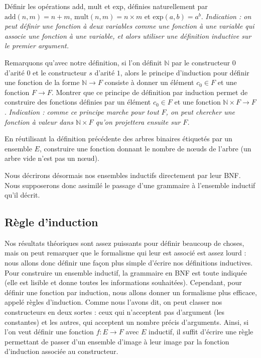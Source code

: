 \begin{exo}
    Définir les opérations add, mult et exp, définies naturellement par $\mathrm{add}(n,m) = n + m$, $\mathrm{mult}(n,m) = n \times m$ et $\mathrm{exp}(a,b) =  a^b$.\newline{}
    \textit{Indication : on peut définir une fonction à deux variables comme une fonction à une variable qui associe une fonction à une variable, et alors utiliser une définition inductive sur le premier argument.}
\end{exo}

\begin{exo}
    Remarquons qu'avec notre définition, si l'on définit $\mathbb N$ par le constructeur $0$ d'arité $0$ et le constructeur $s$ d'arité $1$, alors le principe d'induction pour définir une fonction de la forme $\mathbb N \to F$ consiste à donner un élément $c_0 \in F$ et une fonction $F\to F$. Montrer que ce principe de définition par induction permet de construire des fonctions définies par un élément $c_0\in F$ et une fonction $\mathbb N \times F \to F$. \textit{Indication : comme ce principe marche pour tout $F$, on peut chercher une fonction à valeur dans $\mathbb N \times F$ qu'on projettera ensuite sur $F$.}
\end{exo}

\begin{exo}\label{exo_arbre}
    En réutilisant la définition précédente des arbres binaires étiquetés par un ensemble $E$, construire une fonction donnant le nombre de n\oe uds de l'arbre (un arbre vide n'est pas un n\oe ud).
\end{exo}

Nous décrirons désormais nos ensembles inductifs directement par leur BNF. Nous supposerons donc assimilé le passage d'une grammaire à l'ensemble inductif qu'il décrit.

\subsection{Règle d'induction}

Nos résultats théoriques sont assez puissants pour définir beaucoup de choses, mais on peut remarquer que le formalisme qui leur est associé est assez lourd : nous allons donc définir une façon plus simple d'écrire nos définitions inductives. Pour construire un ensemble inductif, la grammaire en BNF est toute indiquée (elle est lisible et donne toutes les informations souhaitées). Cependant, pour définir une fonction par induction, nous allons donner un formalisme plus efficace, appelé règles d'induction. Comme nous l'avons dit, on peut classer nos constructeurs en deux sortes : ceux qui n'acceptent pas d'argument (les constantes) et les autres, qui acceptent un nombre précis d'arguments. Ainsi, si l'on veut définir une fonction $f : E \to F$ avec $E$ inductif, il suffit d'écrire une \og règle\fg{} permettant de passer d'un ensemble d'image à leur image par la fonction d'induction associée au constructeur.


